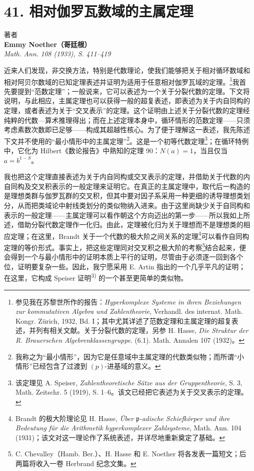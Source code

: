 \documentclass[11pt]{article}
\begin{document}
\section*{41. 相对伽罗瓦数域的主属定理}

\begin{center}
著者\\[0.4ex]
\textbf{Emmy Noether（哥廷根）}\\[0.8ex]
\emph{Math. Ann. 108 (1933), S. 411--419}
\end{center}

近来人们发现，非交换方法，特别是代数理论，使我们能够把关于相对循环数域和相对阿贝尔数域的已知定理表述并证明为适用于任意相对伽罗瓦域的定理。\footnote{参见我在苏黎世所作的报告：\emph{Hyperkomplexe Systeme in ihren Beziehungen zur kommutativen Algebra und Zahlentheorie}, Verhandl. des internat. Math. Kongr. Zürich, 1932, Bd. I；其中尤其详述了范数定理和主属定理的超复表述，并列有相关文献。关于分裂代数的定理，另参 H. Hasse, \emph{Die Struktur der R. Brauerschen Algebrenklassengruppe}. (6.1). Math. Annalen 107 (1932)。}我首先要提到“范数定理”；一般说来，它可以表述为一个关于分裂代数的定理。下文将说明，与此相应，主属定理也可以获得一般的超复表述，即表述为关于内自同构的定理，或者表述为关于“交叉表示”的定理。这个证明由上述关于分裂代数的定理经纯粹的代数—算术推理得出；而在上述定理本身中，循环情形的范数定理——只须考虑素数次数即已足够——构成其超越性核心。为了便于理解这一表述，我先陈述下文并不使用的“最小情形中的主属定理”\footnote{我称之为“最小情形”，因为它是任意域中主属定理的代数类似物；而所谓“小情形”已经包含了过渡到 $(p)$-进基域的意义。}。这是一个初等代数定理\footnote{该定理见 A. Speiser, \emph{Zahlentheoretische Sätze aus der Gruppentheorie}, S. 3, Math. Zeitschr. 5 (1919), S. 1--6。该文已经把它表述为关于交叉表示的定理。}；在循环特例中，它化为 Hilbert《数论报告》中熟知的定理 90：$N(a)=1$，当且仅当 $a=b^{1-S}$。

我也把这个定理直接表述为关于内自同构或交叉表示的定理，并借助关于代数的内自同构及交叉积表示的一般定理来证明它。在真正的主属定理中，取代后一构造的是理想类群与伽罗瓦群的交叉积，但其中要对因子系采用一种更细的诱导理想类划分，从而把类域论中射线类划分的类似物纳入进来。由于这里尚缺少关于自同构和表示的一般定理——主属定理可以看作朝这个方向迈出的第一步——所以我如上所述，借助分裂代数定理作一化归。由此，定理被化归为关于理想而不是理想类的相应定理；在这里，Brandt 关于一个代数的极大阶之间关系的定理\footnote{Brandt 的极大阶理论见 H. Hasse, \emph{Über \(\mathfrak p\)-adische Schiefkörper und ihre Bedeutung für die Arithmetik hyperkomplexer Zahlsysteme}, Math. Ann. 104 (1931)；该文对这一理论作了系统表述，并详尽地重新奠定了基础。}可以看作自同构定理的等价形式。事实上，把这些定理同对交叉积之极大阶的考察\footnote{C. Chevalley（Hamb. Ber.）、H. Hasse 和 E. Noether 将各发表一篇短文；后两篇将收入一卷 Herbrand 纪念文集。}结合起来，便会得到一个与最小情形中的证明本质上平行的证明，尽管由于必须逐一回到各个位，证明要复杂一些。因此，我宁愿采用 E. Artin 指出的一个几乎平凡的证明；在这里，它构成 Speiser 证明\textsuperscript{3)} 的一个甚至更简单的类似物。
\end{document}
